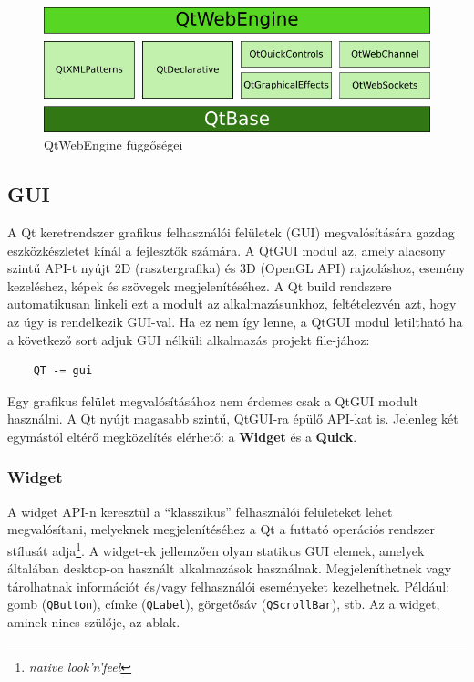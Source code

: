 \documentclass[12pt]{report}
\begin{document}
\begin{figure}[h]
    \centering
    \includegraphics[scale=.66]{qtwebengine-dependencies}
    \caption{
        \label{fig:qtwebengine-dependencies}
        QtWebEngine függőségei
    }
\end{figure}

\subsection{GUI}
\label{sec:qt-gui}
A Qt keretrendszer grafikus felhasználói felületek (GUI) megvalósítására gazdag
eszközkészletet kínál a fejlesztők számára. A QtGUI modul az, amely alacsony szintű API-t
nyújt 2D (rasztergrafika) és 3D (OpenGL API) rajzoláshoz, esemény kezeléshez, képek és
szövegek megjelenítéséhez. A Qt build rendszere automatikusan linkeli ezt a modult az
alkalmazásunkhoz, feltételezvén azt, hogy az úgy is rendelkezik GUI-val. Ha ez nem így
lenne, a QtGUI modul letiltható ha a következő sort adjuk GUI nélküli alkalmazás
projekt file-jához:
\begin{verbatim}
    QT -= gui
\end{verbatim}

Egy grafikus felület megvalósításához nem érdemes csak a QtGUI modult használni. A Qt nyújt
magasabb szintű, QtGUI-ra épülő API-kat is. Jelenleg két egymástól eltérő megközelítés
elérhető: a \textbf{Widget} és a \textbf{Quick}.
\cite{bib:qt-doc-qt-gui, bib:qt-doc-user-interfaces}

\subsubsection{Widget}
A widget API-n keresztül a ``klasszikus'' felhasználói felületeket lehet megvalósítani,
melyeknek megjelenítéséhez a Qt a futtató operációs rendszer stílusát adja\footnote{
\textit{native look'n'feel}}. A widget-ek jellemzően olyan statikus GUI elemek, amelyek
általában desktop-on használt alkalmazások használnak. Megjeleníthetnek vagy tárolhatnak
információt és/vagy felhasználói eseményeket kezelhetnek. Például: gomb (\texttt{QButton}),
címke (\texttt{QLabel}), görgetősáv (\texttt{QScrollBar}), stb. Az a widget, aminek nincs
szülője, az ablak.
\cite{bib:qt-doc-qt-widgets}
\end{document}

